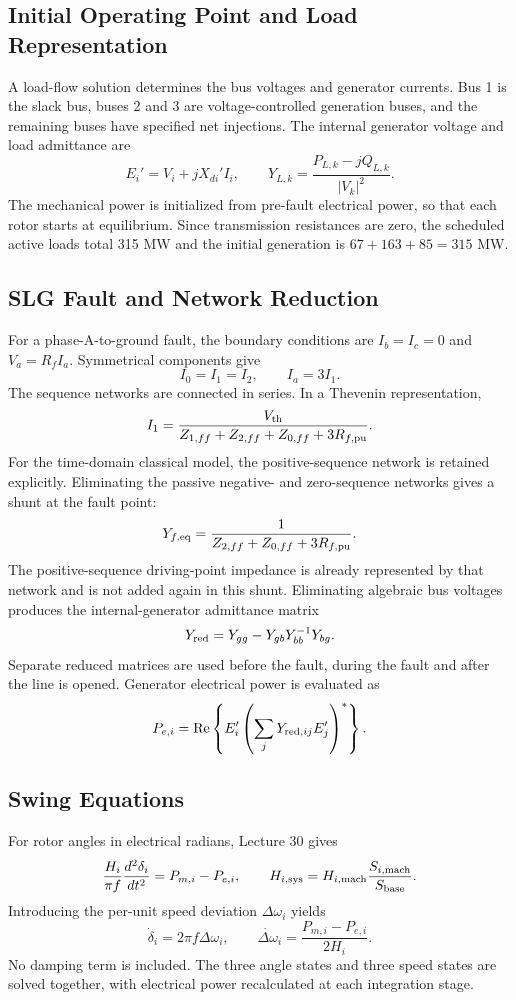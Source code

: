 \documentclass[11pt,a4paper]{article}
\begin{document}
\subsection{Initial Operating Point and Load Representation}
A load-flow solution determines the bus voltages and generator currents. Bus 1 is the slack bus, buses 2 and 3 are voltage-controlled generation buses, and the remaining buses have specified net injections. The internal generator voltage and load admittance are
\[E_i'=V_i+jX_{di}'I_i,\qquad Y_{L,k}=\frac{P_{L,k}-jQ_{L,k}}{|V_k|^2}.\]
The mechanical power is initialized from pre-fault electrical power, so that each rotor starts at equilibrium. Since transmission resistances are zero, the scheduled active loads total 315 MW and the initial generation is $67+163+85=315$ MW.
\newpage
\subsection{SLG Fault and Network Reduction}
For a phase-A-to-ground fault, the boundary conditions are $I_b=I_c=0$ and $V_a=R_fI_a$. Symmetrical components give
\[I_0=I_1=I_2,\qquad I_a=3I_1.\]
The sequence networks are connected in series. In a Thevenin representation,
\[I_1=\frac{V_{\rm th}}{Z_{1,ff}+Z_{2,ff}+Z_{0,ff}+3R_{f,\rm pu}}.\]
For the time-domain classical model, the positive-sequence network is retained explicitly. Eliminating the passive negative- and zero-sequence networks gives a shunt at the fault point:
\[Y_{f,\rm eq}=\frac{1}{Z_{2,ff}+Z_{0,ff}+3R_{f,\rm pu}}.\]
The positive-sequence driving-point impedance is already represented by that network and is not added again in this shunt. Eliminating algebraic bus voltages produces the internal-generator admittance matrix
\[Y_{\rm red}=Y_{gg}-Y_{gb}Y_{bb}^{-1}Y_{bg}.\]
Separate reduced matrices are used before the fault, during the fault and after the line is opened. Generator electrical power is evaluated as
\[P_{e,i}=\operatorname{Re}\left\{E_i'\left(\sum_jY_{{\rm red},ij}E_j'\right)^*\right\}.\]
\subsection{Swing Equations}
For rotor angles in electrical radians, Lecture 30 gives
\[\frac{H_i}{\pi f}\frac{d^2\delta_i}{dt^2}=P_{m,i}-P_{e,i},\qquad
H_{i,\rm sys}=H_{i,\rm mach}\frac{S_{i,\rm mach}}{S_{\rm base}}.\]
Introducing the per-unit speed deviation $\Delta\omega_i$ yields
\[\dot\delta_i=2\pi f\Delta\omega_i,\qquad
\dot{\Delta\omega}_i=\frac{P_{m,i}-P_{e,i}}{2H_i}.\]
No damping term is included. The three angle states and three speed states are solved together, with electrical power recalculated at each integration stage.
\end{document}
